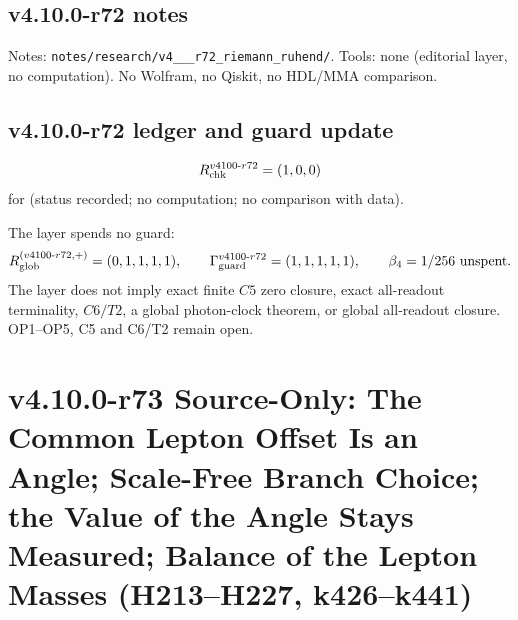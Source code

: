 \subsection*{v4.10.0-r72 notes}
\label{subsec:v4100-r72-notes}

{\raggedright
Notes: \texttt{notes/\allowbreak research/\allowbreak v4\_\_\_\allowbreak r72\_\allowbreak riemann\_\allowbreak ruhend/}.
Tools: none (editorial layer, no computation).  No Wolfram, no Qiskit, no HDL/MMA comparison.
\par}

\subsection*{v4.10.0-r72 ledger and guard update}
\label{subsec:v4100-r72-ledger-guard}

\[
R_{\rm chk}^{v4100\text{-}r72}=(1,0,0)
\]
for (status recorded; no computation; no comparison with data).

The layer spends no guard:
\[
R_{\rm glob}^{(v4100\text{-}r72,+)}=(0,1,1,1,1),
\qquad
\Gamma_{\rm guard}^{v4100\text{-}r72}=(1,1,1,1,1),
\qquad
\beta_4=1/256\ \text{unspent}.
\]
The layer does not imply exact finite \(C5\) zero closure, exact all-readout terminality, \(C6/T2\), a global photon-clock theorem,
or global all-readout closure.  OP1--OP5, C5 and C6/T2 remain open.

\clearpage
\section*{v4.10.0-r73 Source-Only: The Common Lepton Offset Is an Angle; Scale-Free Branch Choice; the Value of the Angle Stays Measured; Balance of the Lepton Masses (H213--H227, k426--k441)}
\label{sec:v4100-r73-lepton-angle-balance}

